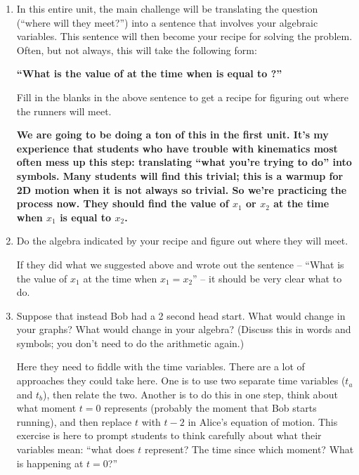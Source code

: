 \documentclass[12pt]{article}
\begin{document}
\begin{enumerate}
\item In this entire unit, the main challenge will be translating the question (``where will they meet?'') into a sentence that involves your algebraic variables. This sentence will then become your recipe for solving the problem.
Often, but not always, this will take the following form: 

\begin{center}
{\bf ``What is the value of \underline{\hspace{0.7in}} at the time when \underline{\hspace{0.7in}} is equal to \underline{\hspace{0.7in}}?''} 
\end{center}

Fill in the blanks in the above sentence to get a recipe for figuring out where the runners will meet.

{\color{Red} \bf We are going to be doing a ton of this in the first unit. \rm It's my experience that students who have trouble with kinematics most often mess up this step: translating ``what you're trying to do'' into symbols. Many students will find this trivial; this is a warmup for 2D motion when it is not always so trivial. So we're practicing the process now. They should find the value of $x_1$ or $x_2$ at the time when $x_1$ is equal to $x_2$.}

\item Do the algebra indicated by your recipe and figure out where they will meet.

{\color{Red}If they did what we suggested above and wrote out the sentence -- ``What is the value of $x_1$ at the time when $x_1 = x_2$'' -- it should be very clear what to do.}


\item Suppose that instead Bob had a 2 second head start. What would change in your graphs? What would change in your algebra? (Discuss this in words and symbols; you don't need to do the arithmetic again.)

{\color{Red} Here they need to fiddle with the time variables. There are a lot of approaches they could take here. One is to use two separate time variables ($t_a$ and $t_b$), then relate the two. Another is to do this in one step, think about what moment $t=0$ represents (probably the moment that Bob starts running), and then replace $t$ with $t-2$ in Alice's equation of motion. This exercise is here to prompt students to think carefully about what their variables mean: ``what does $t$ represent? The time since which moment? What is happening at $t=0$?''}


\end{enumerate}
\end{document}
